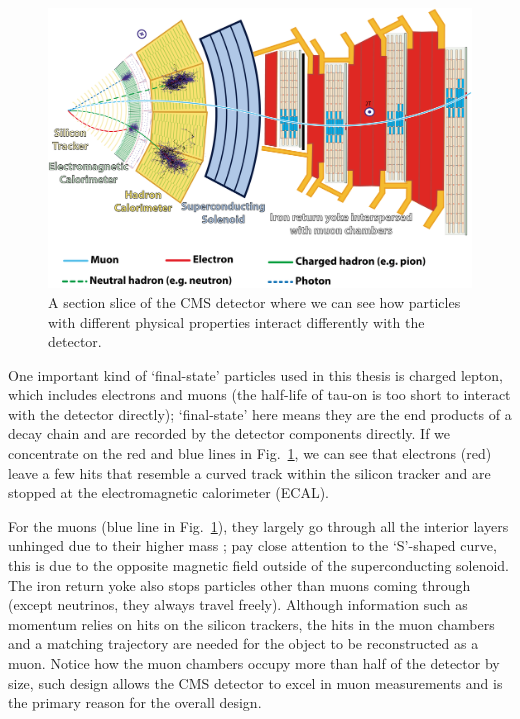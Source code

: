 \begin{figure}[htb]
\begin{center}
\includegraphics[width=.75\linewidth]{fig/CMS_Slice.png}
\end{center}
\caption{A section slice of the CMS detector where we can see how 
particles with different physical properties interact differently with the detector.\protect\footnotemark}
\label{fig:CMS_Slice}
\end{figure}

One important kind of `final-state' particles used in this thesis is charged lepton, 
which includes electrons and muons (the half-life of tau-on is too short to interact with
the detector directly);
`final-state' here means they are the end products of a decay chain and are recorded by the detector
components directly. If we concentrate on the red and blue lines in Fig.~\ref{fig:CMS_Slice}, we
can see that  electrons (red) leave a few hits that resemble a curved
track within the silicon tracker and are stopped at the electromagnetic calorimeter
(ECAL). 

For the muons (blue line in Fig.~\ref{fig:CMS_Slice}), they largely go through all the interior layers unhinged 
due to their higher mass ;
pay close attention to the `S'-shaped curve, this is due to the opposite magnetic
field outside of the superconducting solenoid. The iron return yoke also stops particles other than
muons coming through (except neutrinos, they always travel freely). Although information such as momentum relies on
hits on the silicon trackers, the hits in the muon chambers and a matching trajectory are needed 
for the object to be reconstructed as a muon. Notice how the
muon chambers occupy more than half of the detector by size, such design allows the CMS 
detector to excel in muon measurements and is the primary reason for the overall design.


